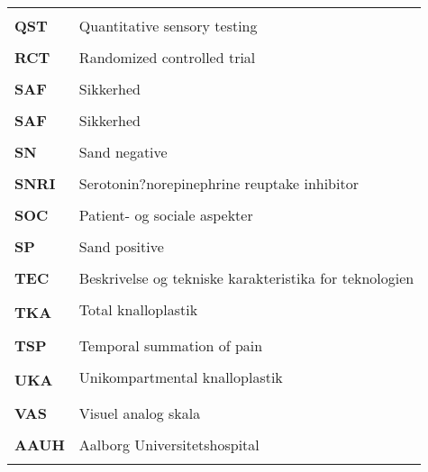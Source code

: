 \begin{longtable}{p{}  p{}}
\\ \\
\textbf{QST} & Quantitative sensory testing                             
\\ \\
\textbf{RCT} & Randomized controlled trial                              
\\ \\
\textbf{SAF} & Sikkerhed                                                
\\ \\
\textbf{SAF} & Sikkerhed                                                
\\ \\
\textbf{SN}  & Sand negative                                            
\\ \\
\textbf{SNRI}& Serotonin?norepinephrine reuptake inhibitor              
\\ \\
\textbf{SOC} & Patient- og sociale aspekter                             
\\ \\
\textbf{SP}  & Sand positive                                            
\\ \\
\textbf{TEC} & Beskrivelse og tekniske karakteristika for teknologien   
\\ \\
\textbf{TKA} & Total knalloplastik                                     
\\ \\
\textbf{TSP} & Temporal summation of pain                               
\\ \\
\textbf{UKA} & Unikompartmental knalloplastik                          
\\ \\
\textbf{VAS} & Visuel analog skala                                      
\\ \\
\textbf{AAUH}& Aalborg Universitetshospital                             
\\ \\



\end{longtable}
